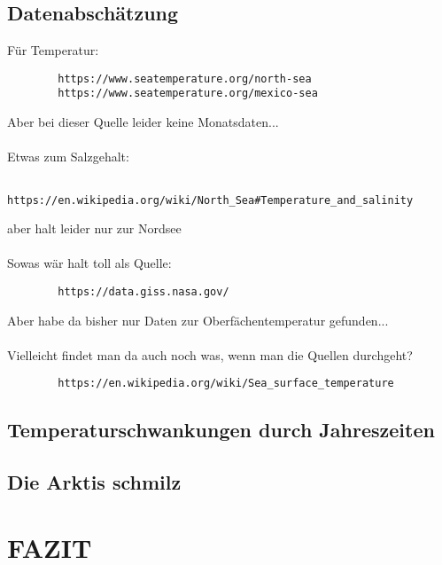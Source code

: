 \documentclass[a4paper,twoside]{article}
\begin{document}
	\subsection{Datenabschätzung}
	\noindent Für Temperatur:
	\begin{verbatim}
		https://www.seatemperature.org/north-sea
		https://www.seatemperature.org/mexico-sea
	\end{verbatim}
	Aber bei dieser Quelle leider keine Monatsdaten... \\
	\\
	Etwas zum Salzgehalt:
	\begin{verbatim}
		https://en.wikipedia.org/wiki/North_Sea#Temperature_and_salinity
	\end{verbatim}
	aber halt leider nur zur Nordsee \\	
	\\
	Sowas wär halt toll als Quelle:
	\begin{verbatim}
		https://data.giss.nasa.gov/
	\end{verbatim}
	Aber habe da bisher nur Daten zur Oberfächentemperatur gefunden... \\
	\\
	Vielleicht findet man da auch noch was, wenn man die Quellen durchgeht?
	\begin{verbatim}
		https://en.wikipedia.org/wiki/Sea_surface_temperature
	\end{verbatim}
	
	
	\subsection{Temperaturschwankungen durch Jahreszeiten}
	
	\subsection{Die Arktis schmilz}
	
	\section{\uppercase{Fazit}}\label{sec:Fazit}
\end{document}
